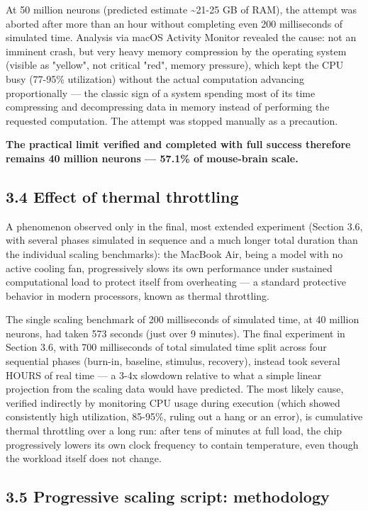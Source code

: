 \documentclass[
  english,
]{article}
\begin{document}
At 50 million neurons (predicted estimate \textasciitilde21-25 GB of RAM), the attempt was aborted after more than an hour without completing even 200 milliseconds of simulated time. Analysis via macOS Activity Monitor revealed the cause: not an imminent crash, but very heavy memory compression by the operating system (visible as "yellow", not critical "red", memory pressure), which kept the CPU busy (77-95\% utilization) without the actual computation advancing proportionally --- the classic sign of a system spending most of its time compressing and decompressing data in memory instead of performing the requested computation. The attempt was stopped manually as a precaution.

\textbf{The practical limit verified and completed with full success therefore remains 40 million neurons --- 57.1\% of mouse-brain scale.}

\subsection{3.4 Effect of thermal throttling}\label{effect-of-thermal-throttling}

A phenomenon observed only in the final, most extended experiment (Section 3.6, with several phases simulated in sequence and a much longer total duration than the individual scaling benchmarks): the MacBook Air, being a model with no active cooling fan, progressively slows its own performance under sustained computational load to protect itself from overheating --- a standard protective behavior in modern processors, known as thermal throttling.

The single scaling benchmark of 200 milliseconds of simulated time, at 40 million neurons, had taken 573 seconds (just over 9 minutes). The final experiment in Section 3.6, with 700 milliseconds of total simulated time split across four sequential phases (burn-in, baseline, stimulus, recovery), instead took several HOURS of real time --- a 3-4x slowdown relative to what a simple linear projection from the scaling data would have predicted. The most likely cause, verified indirectly by monitoring CPU usage during execution (which showed consistently high utilization, 85-95\%, ruling out a hang or an error), is cumulative thermal throttling over a long run: after tens of minutes at full load, the chip progressively lowers its own clock frequency to contain temperature, even though the workload itself does not change.

\subsection{3.5 Progressive scaling script: methodology}\label{progressive-scaling-script-methodology}
\end{document}

